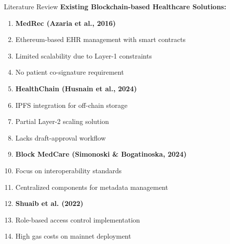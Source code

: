 \documentclass[10pt]{beamer}
\let\olditemize\itemize
\let\endolditemize\enditemize
\renewenvironment{itemize}
  {\olditemize\justifying}
  {\endolditemize}
\begin{document}
\begin{frame}{Literature Review}
\textbf{Existing Blockchain-based Healthcare Solutions:}

\begin{enumerate}
\item \textbf{MedRec (Azaria et al., 2016)}
    \begin{itemize}
    \item Ethereum-based EHR management with smart contracts
    \item Limited scalability due to Layer-1 constraints
    \item No patient co-signature requirement
    \end{itemize}

\item \textbf{HealthChain (Husnain et al., 2024)}
    \begin{itemize}
    \item IPFS integration for off-chain storage
    \item Partial Layer-2 scaling solution
    \item Lacks draft-approval workflow
    \end{itemize}

\item \textbf{Block MedCare (Simonoski \& Bogatinoska, 2024)}
    \begin{itemize}
    \item Focus on interoperability standards
    \item Centralized components for metadata management
    \end{itemize}

\item \textbf{Shuaib et al. (2022)}
    \begin{itemize}
    \item Role-based access control implementation
    \item High gas costs on mainnet deployment
    \end{itemize}
\end{enumerate}
\end{frame}
\end{document}
